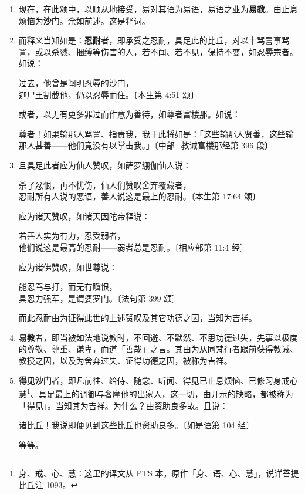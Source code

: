 \begin{enumerate}\item 现在，在此颂中，以顺从地接受，易对其语为易语，易语之业为\textbf{易教}。由止息烦恼为\textbf{沙门}。余如前述。这是释词。
\item 而释义当知如是：\textbf{忍耐}者，即承受之忍耐，具足此的比丘，对以十骂詈事骂詈，或以杀戮、捆缚等伤害的人，若不闻、若不见，保持不变，如忍辱宗者。如说：\begin{quoting}过去，他曾是阐明忍辱的沙门，\\迦尸王割截他，仍以忍辱而住。{\bluefootnotesize 〔本生第 4:51 颂〕}\end{quoting}或者，以无有更多罪过而作意为善待，如尊者富楼那。如说：\begin{quoting}尊者！如果输那人骂詈、指责我，我于此将如是：「这些输那人贤善，这些输那人甚善——他们竟没有以掌击我。」{\bluefootnotesize 〔中部·教诫富楼那经第 396 段〕}\end{quoting}
\item 且具足此者应为仙人赞叹，如萨罗绷伽仙人说：\begin{quoting}杀了忿恨，再不忧伤，仙人们赞叹舍弃覆藏者，\\忍耐所有人说的恶语，善人说这是最上的忍耐。{\bluefootnotesize 〔本生第 17:64 颂〕}\end{quoting}应为诸天赞叹，如诸天因陀帝释说：\begin{quoting}若善人实为有力，忍受弱者，\\他们说这是最高的忍耐——弱者总是忍耐。{\bluefootnotesize 〔相应部第 11:4 经〕}\end{quoting} 应为诸佛赞叹，如世尊说：\begin{quoting}能忍骂与打，而无有瞋恨，\\具忍力强军，是谓婆罗门。{\bluefootnotesize 〔法句第 399 颂〕}\end{quoting}而此忍耐由为证得此世的上述赞叹及其它功德之因，当知为吉祥。
\item \textbf{易教}者，即当被如法地说教时，不回避、不默然、不思功德过失，先事以极度的尊敬、尊重、谦卑，而道「善哉」之言。其由为从同梵行者跟前获得教诫、教授之因，以及为舍弃过失、证得功德之因，被称为吉祥。
\item \textbf{得见沙门}者，即凡前往、给侍、随念、听闻、得见已止息烦恼、已修习身戒心慧\footnote{身、戒、心、慧：这里的译文从 PTS 本，原作「身、语、心、慧」，说详菩提比丘注 1093。}、具足最上的调御与奢摩他的出家人，这一切，由开示的缺略，都被称为「得见」。当知其为吉祥。为什么？由资助良多故。且说：\begin{quoting}诸比丘！我说即便见到这些比丘也资助良多。{\bluefootnotesize 〔如是语第 104 经〕}\end{quoting}等等。

\end{enumerate}
